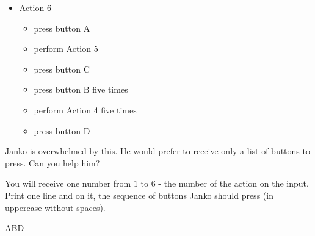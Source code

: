 \begin{itemize}
	\item[\scriptsize\ding{108}] Action 6
	\begin{itemize}
		\item[\scriptsize\ding{108}] press button A
		\item[\scriptsize\ding{108}] perform Action 5
		\item[\scriptsize\ding{108}] press button C
		\item[\scriptsize\ding{108}] press button B five times
		\item[\scriptsize\ding{108}] perform Action 4 five times
		\item[\scriptsize\ding{108}] press button D
	\end{itemize}

\end{itemize}

Janko is overwhelmed by this. He would prefer to receive only a list of buttons to press.
Can you help him?

You will receive one number from $1$ to $6$ - the number of the action on the input. Print one line and on it, the sequence of buttons Janko should press (in uppercase without spaces).

\vystup
ABD
\koniec


